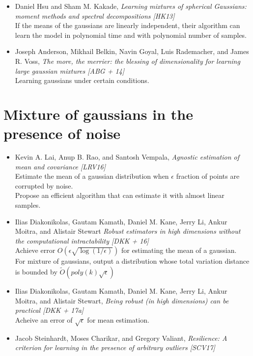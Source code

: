 \documentclass[12pt]{article}
\begin{document}
\begin{itemize}
	\item Daniel Hsu and Sham M. Kakade, {\em Learning mixtures of spherical Gaussians: moment methods and spectral decompositions [HK13]}\\
	If the  means  of  the  gaussians  are  linearly  independent,  their algorithm can learn the model in polynomial time and with polynomial number of samples.
	
	\item Joseph Anderson, Mikhail Belkin, Navin Goyal, Luis Rademacher, and James R. Voss, {\em The more, the merrier: the blessing of dimensionality for learning large gaussian mixtures [ABG + 14]}\\
	Learning gaussians under certain conditions.		
\end{itemize}
	
\section{Mixture of gaussians in the presence of noise}
\begin{itemize}
	\item Kevin A. Lai, Anup B. Rao, and Santosh Vempala, {\em Agnostic estimation of mean and covariance [LRV16]}\\
	Estimate the mean of a gaussian distribution when $\epsilon$ fraction of points are corrupted by noise.\\
	Propose an efficient algorithm that can estimate it with almost linear samples.
	
	\item Ilias Diakonikolas, Gautam Kamath, Daniel M. Kane, Jerry Li, Ankur Moitra, and Alistair Stewart {\em Robust estimators in high dimensions without the computational intractability [DKK + 16]}\\
	Achieve error $O(\epsilon\sqrt{\log (1/\epsilon)})$ for estimating the mean of a gaussian.\\
	For mixture of gaussians, output a distribution whose total variation distance is bounded by $\tilde O(poly(k)\sqrt\epsilon)$ 
	
	\item Ilias Diakonikolas, Gautam Kamath, Daniel M. Kane, Jerry Li, Ankur Moitra, and
Alistair Stewart, {\em Being robust (in high dimensions) can be practical [DKK + 17a]}\\
	Acheive an error of $\sqrt\epsilon$ for mean estimation.
	
	\item Jacob Steinhardt, Moses Charikar, and Gregory Valiant, {\em Resilience: A criterion for
learning in the presence of arbitrary outliers [SCV17]}\\
	
\end{itemize}
	
\end{document}
